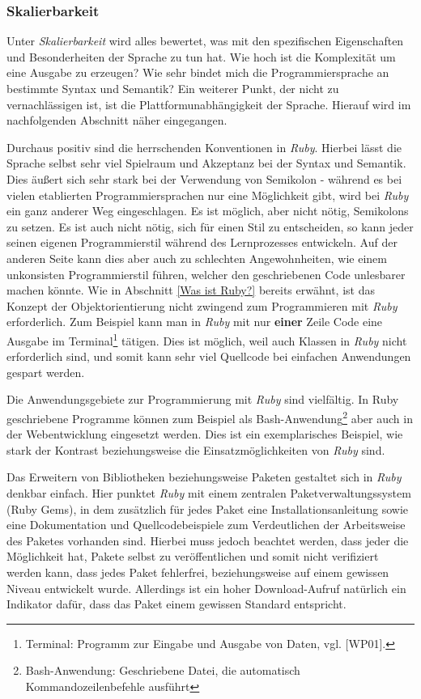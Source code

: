 \documentclass[12pt,DIV=14, version=first, BCOR=10mm,a4paper,twoside,parskip=half-,headsepline,headinclude]{scrartcl}
\begin{document}
\subsubsection{Skalierbarkeit} \label{Skalierbarkeit}
\begin{flushleft}
Unter \textit{Skalierbarkeit} wird alles bewertet, was mit den spezifischen Eigenschaften und Besonderheiten der Sprache zu tun hat. Wie hoch ist die Komplexität um eine Ausgabe zu erzeugen? Wie sehr bindet mich die Programmiersprache an bestimmte Syntax und Semantik? Ein weiterer Punkt, der nicht zu vernachlässigen ist, ist die Plattformunabhängigkeit der Sprache. Hierauf wird im nachfolgenden Abschnitt näher eingegangen.

Durchaus positiv sind die herrschenden Konventionen in \textit{\glqq Ruby\grqq}. Hierbei lässt die Sprache selbst sehr viel Spielraum und Akzeptanz bei der Syntax und Semantik. Dies äußert sich sehr stark bei der Verwendung von Semikolon - während es bei vielen etablierten Programmiersprachen nur eine Möglichkeit gibt, wird bei \textit{\glqq Ruby\grqq} ein ganz anderer Weg eingeschlagen. Es ist möglich, aber nicht nötig, Semikolons zu setzen. Es ist auch nicht nötig, sich für einen Stil zu entscheiden, so kann jeder seinen eigenen Programmierstil während des Lernprozesses entwickeln. Auf der anderen Seite kann dies aber auch zu schlechten Angewohnheiten, wie einem unkonsisten Programmierstil führen, welcher den geschriebenen Code unlesbarer machen könnte. Wie in Abschnitt \ref{Was ist Ruby?} bereits erwähnt, ist das Konzept der Objektorientierung nicht zwingend zum Programmieren mit \textit{\glqq Ruby\grqq} erforderlich. Zum Beispiel kann man in \textit{\glqq Ruby\grqq} mit nur \textbf{einer} Zeile Code eine Ausgabe im Terminal\footnote{\label{foot:3} {Terminal: Programm zur Eingabe und Ausgabe von Daten, vgl. [WP01].}} tätigen. Dies ist möglich, weil auch Klassen in \textit{\glqq Ruby\grqq} nicht erforderlich sind, und somit kann sehr viel Quellcode bei einfachen Anwendungen gespart werden.

Die Anwendungsgebiete zur Programmierung mit \textit{\glqq Ruby\grqq} sind vielfältig. In Ruby geschriebene Programme können zum Beispiel als Bash-Anwendung\footnote{\label{foot:4} {Bash-Anwendung: Geschriebene Datei, die automatisch Kommandozeilenbefehle ausführt}} aber auch in der Webentwicklung eingesetzt werden. Dies ist ein exemplarisches Beispiel, wie stark der Kontrast beziehungsweise die Einsatzmöglichkeiten von \textit{\glqq Ruby\grqq} sind.

Das Erweitern von Bibliotheken beziehungsweise Paketen gestaltet sich in \textit{\glqq Ruby\grqq} denkbar einfach. Hier punktet \textit{\glqq Ruby\grqq} mit einem zentralen Paketverwaltungssystem (Ruby Gems), in dem zusätzlich für jedes Paket eine Installationsanleitung sowie eine Dokumentation und Quellcodebeispiele zum Verdeutlichen der Arbeitsweise des Paketes vorhanden sind. Hierbei muss jedoch beachtet werden, dass jeder die Möglichkeit hat, Pakete selbst zu veröffentlichen und somit nicht verifiziert werden kann, dass jedes Paket fehlerfrei, beziehungsweise auf einem gewissen Niveau entwickelt wurde. Allerdings ist ein hoher Download-Aufruf natürlich ein Indikator dafür, dass das Paket einem gewissen Standard entspricht.


\end{flushleft}
\end{document}
